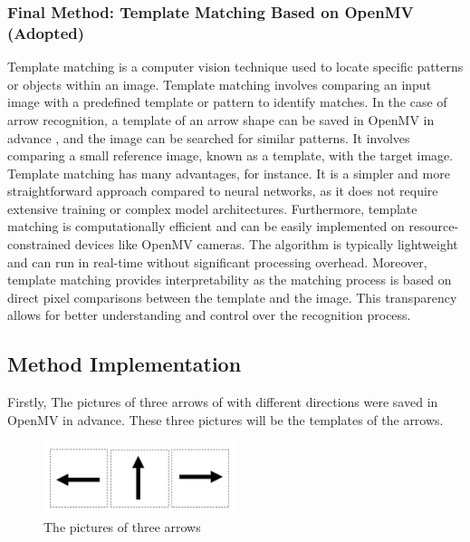 \documentclass[12pt, a4paper, oneside]{report}
\begin{document}
\subsubsection{Final Method: Template Matching Based on OpenMV (Adopted) }
Template matching is a computer vision technique used to locate specific patterns or objects within an image. Template matching involves comparing an input image with a predefined template or pattern to identify matches. In the case of arrow recognition, a template of an arrow shape can be saved in OpenMV in advance , and the image can be searched for similar patterns. It involves comparing a small reference image, known as a template, with the target image. Template matching has many advantages, for instance. It is a simpler and more straightforward approach compared to neural networks, as it does not require extensive training or complex model architectures. Furthermore, template matching is computationally efficient and can be easily implemented on resource-constrained devices like OpenMV cameras. The algorithm is typically lightweight and can run in real-time without significant processing overhead. Moreover, template matching provides interpretability as the matching process is based on direct pixel comparisons between the template and the image. This transparency allows for better understanding and control over the recognition process. 
\subsection{Method Implementation}
Firstly, The pictures of three arrows of with different directions were saved in OpenMV in advance. These three pictures will be the templates of the arrows. 

\begin{figure}[H]
  \centering
  \includegraphics[width=0.5\textwidth]{pic/Arrow Rec/1.png}
  \caption{The pictures of three arrows}
  \label{fig:The pictures of three arrows}
\end{figure}
\end{document}
